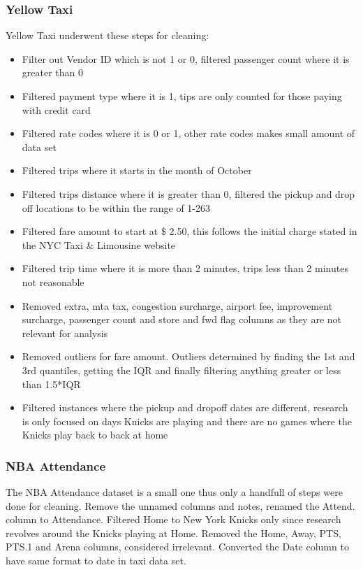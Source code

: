 \documentclass[11pt]{article}
\begin{document}
\subsubsection{Yellow Taxi}
Yellow Taxi underwent these steps for cleaning:
\begin{itemize}
    \item{Filter out Vendor ID which is not 1 or 0, filtered passenger count where it is greater than 0 }
    \item{Filtered payment type where it is 1, tips are only counted for those paying with credit card}
    \item{Filtered rate codes where it is 0 or 1, other rate codes makes small amount of data set}
    \item{Filtered trips where it starts in the month of October}
    \item{Filtered trips distance where it is greater than 0, filtered the pickup and drop off locations to be within the range of 1-263}
    \item{Filtered fare amount to start at \$ 2.50, this follows the initial charge stated in the NYC Taxi \& Limousine website\cite{initialFareAmount} }
    \item{Filtered trip time where it is more than 2 minutes, trips less than 2 minutes not reasonable}
    \item{Removed extra, mta tax, congestion surcharge, airport fee, improvement surcharge, passenger count and store and fwd flag columns as they are not relevant for analysis}
    \item{Removed outliers for fare amount. Outliers determined by finding the 1st and 3rd quantiles, getting the IQR and finally filtering anything greater or less than 1.5*IQR }
    \item{Filtered instances where the pickup and dropoff dates are different, research is only focused on days Knicks are playing and there are no games where the Knicks play back to back at home}

\end{itemize}
\subsubsection{NBA Attendance}
The NBA Attendance dataset is a small one thus only a handfull of steps were done for cleaning. Remove the unnamed columns and notes, renamed the Attend. column to Attendance. Filtered Home to New York Knicks only since research revolves around the Knicks playing at Home. Removed the Home, Away, PTS, PTS.1 and Arena columns, considered irrelevant. Converted the Date column to have same format to date in taxi data set.
\end{document}

